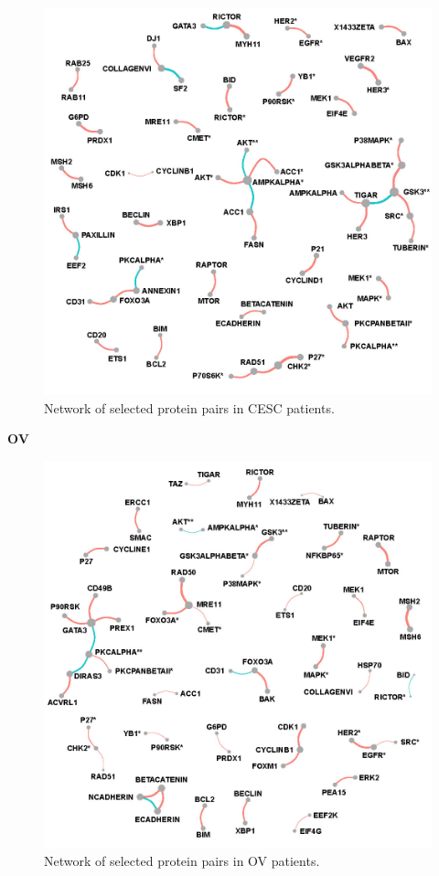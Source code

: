 \documentclass[
]{book}
\begin{document}
\begin{figure}

{\centering \includegraphics[width=0.7\linewidth]{images/pan_fullnet_cesc} 

}

\caption{Network of selected protein pairs in CESC patients.}\label{fig:cescfullnet}
\end{figure}

\textbf{OV}

\begin{figure}

{\centering \includegraphics[width=0.7\linewidth]{images/pan_fullnet_ov} 

}

\caption{Network of selected protein pairs in OV patients.}\label{fig:ovfullnet}
\end{figure}
\end{document}
